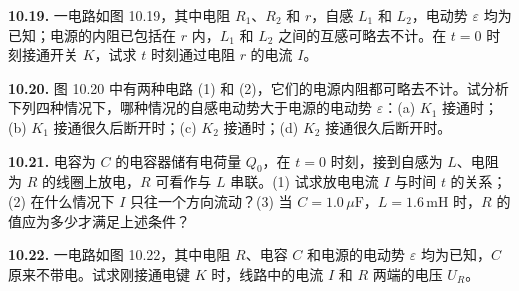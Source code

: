 \begin{center}
\end{center}

\vfill
\newpage

\textbf{10.19.} 一电路如图 10.19，其中电阻 $R_1$、$R_2$ 和 $r$，自感 $L_1$ 和 $L_2$，电动势 $\varepsilon$ 均为已知；电源的内阻已包括在 $r$ 内，$L_1$ 和 $L_2$ 之间的互感可略去不计。在 $t = 0$ 时刻接通开关 $K$，试求 $t$ 时刻通过电阻 $r$ 的电流 $I$。

\begin{center}
\end{center}

\vfill
\newpage

\textbf{10.20.} 图 10.20 中有两种电路 (1) 和 (2)，它们的电源内阻都可略去不计。试分析下列四种情况下，哪种情况的自感电动势大于电源的电动势 $\varepsilon$：(a) $K_1$ 接通时；(b) $K_1$ 接通很久后断开时；(c) $K_2$ 接通时；(d) $K_2$ 接通很久后断开时。

\begin{center}
  \begin{minipage}[b]{0.47\linewidth}
    \centering
  \end{minipage}\hfill
  \begin{minipage}[b]{0.47\linewidth}
    \centering
  \end{minipage}
\end{center}

\vfill
\newpage

\textbf{10.21.} 电容为 $C$ 的电容器储有电荷量 $Q_0$，在 $t = 0$ 时刻，接到自感为 $L$、电阻为 $R$ 的线圈上放电，$R$ 可看作与 $L$ 串联。(1) 试求放电电流 $I$ 与时间 $t$ 的关系；(2) 在什么情况下 $I$ 只往一个方向流动？(3) 当 $C = 1.0\,\mu\mathrm{F}$，$L = 1.6\,\mathrm{mH}$ 时，$R$ 的值应为多少才满足上述条件？

\vfill
\newpage

\textbf{10.22.} 一电路如图 10.22，其中电阻 $R$、电容 $C$ 和电源的电动势 $\varepsilon$ 均为已知，$C$ 原来不带电。试求刚接通电键 $K$ 时，线路中的电流 $I$ 和 $R$ 两端的电压 $U_R$。

\begin{center}
\end{center}

\vfill
\newpage

